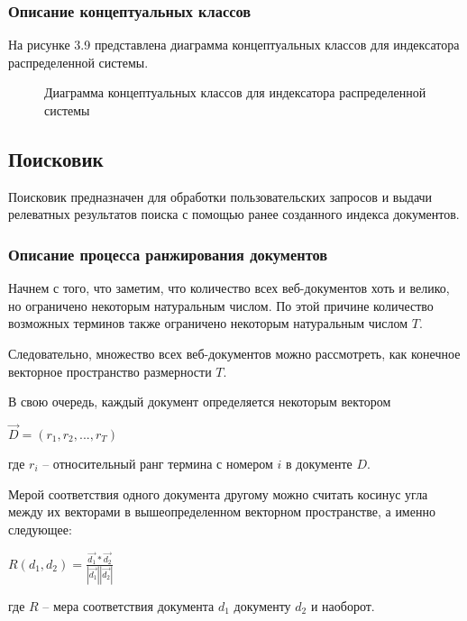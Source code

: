 \subsubsection{Описание концептуальных классов}

На рисунке 3.9 представлена диаграмма концептуальных классов для индексатора распределенной системы.

\begin{figure}
\caption{Диаграмма концептуальных классов для индексатора распределенной системы}
\label{indexer/diagram_classes:image}
\end{figure}

\subsection{Поисковик}

Поисковик предназначен для обработки пользовательских запросов и выдачи релеватных результатов поиска с помощью ранее созданного индекса документов.

\subsubsection{Описание процесса ранжирования документов}

Начнем с того, что заметим, что количество всех веб-документов хоть и велико, но ограничено некоторым натуральным числом. По этой причине количество возможных терминов также ограничено некоторым натуральным числом $T$. 

Следовательно, множество всех веб-документов можно рассмотреть, как конечное векторное пространство размерности $T$. 

В свою очередь, каждый документ определяется некоторым вектором
\begin{center}
$\vec{D}=(r_1, r_2, ..., r_T)$
\end{center} где $r_i$ -- относительный ранг термина с номером $i$ в документе $D$.

Мерой соответствия одного документа другому можно считать косинус угла между их векторами в вышеопределенном векторном пространстве, а именно следующее:

\begin{center}
$R(d_1, d_2)=\frac{\vec{d_1} * \vec{d_2}}{|\vec{d_1}| |\vec{d_2}|}$
\end{center} где $R$ -- мера соответствия документа $d_1$ документу $d_2$ и наоборот.


